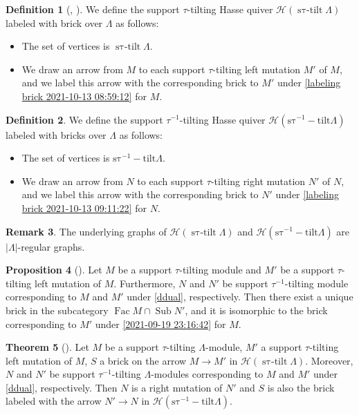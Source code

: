 \documentclass[pdftex,a4paper]{article}
\numberwithin{equation}{subsection}
\theoremstyle{definition}
\newtheorem{theorem}{Theorem}[section]
\newtheorem{proposition}[theorem]{Proposition}
\newtheorem{definition}[theorem]{Definition}
\newtheorem{remark}[theorem]{Remark}
\newcommand{\stautilt}{\operatorname{\mathrm{s\tau-tilt}}}
\newcommand{\stauitilt}{\operatorname{\mathrm{s\tau^{-1}-tilt}}}
\newcommand{\Fac}{\operatorname{\mathrm{Fac}}}
\newcommand{\Sub}{\operatorname{\mathrm{Sub}}}
\begin{document}
\begin{definition}
	[{\cite[Definition 2.29]{MR3187626}, \cite[Definition 2.14]{MR4139031}}]\label{Hasse rabeled by brick}
	We define the support \(\tau\)-tilting Hasse quiver \(\mathcal{H}(\stautilt \Lambda)\) labeled with brick over \(\Lambda\) as follows:
	\begin{itemize}
		\item The set of vertices is \(\stautilt \Lambda\).
		\item We draw an arrow from \(M\) to each support \(\tau\)-tilting left mutation \(M'\) of \(M\), and we label this arrow with the corresponding brick to \(M'\) under \eqref{labeling brick 2021-10-13 08:59:12} for \(M\).
	\end{itemize}
\end{definition}

\begin{definition}
	\label{Hasse i rabeled by brick}
	We define the support \(\tau^{-1}\)-tilting Hasse quiver \(\mathcal{H}(\stauitilt \Lambda)\) labeled with bricks over \(\Lambda\) as follows:
	\begin{itemize}
		\item The set of vertices is \(\stauitilt \Lambda\).
		\item We draw an arrow from \(N\) to each support \(\tau\)-tilting right mutation \(N'\) of \(N\), and we label this arrow with the corresponding brick to \(N'\) under \eqref{labeling brick 2021-10-13 09:11:22} for \(N\).
	\end{itemize}
\end{definition}

\begin{remark}\label{2020-03-20 15:46:59}
	The underlying graphs of \(\mathcal{H}(\stautilt \Lambda)\) and \(\mathcal{H}(\stauitilt \Lambda)\) are \(|\Lambda|\)-regular graphs.
\end{remark}
\begin{proposition}[{\cite[Lemma 2.16, Proposition 2.17]{MR4139031}}]\label{labeling properties 2021-11-14 17:10:59}
	Let \(M\) be a support \(\tau\)-tilting module and \(M'\) be a support \(\tau\)-tilting left mutation of \(M\).
	Furthermore, \(N\) and \(N'\) be support \(\tau^{-1}\)-tilting module corresponding to \(M\) and \(M'\) under \eqref{ddual}, respectively.
	Then there exist a unique brick in the subcategory \(\Fac M \cap \Sub N'\), and it is isomorphic to the brick corresponding to \(M'\) under \eqref{2021-09-19 23:16:42} for \(M\).
\end{proposition}
\begin{theorem}
	[{\cite[Theorem 2.15, Lemma 2.16, Proposition 2.17]{MR4139031}}]
	Let \(M\) be a support \(\tau\)-tilting \(\Lambda\)-module, \(M'\) a support \(\tau\)-tilting left mutation of \(M\), \(S\) a brick on the arrow \(M\rightarrow M'\) in \(\mathcal{H}(\stautilt \Lambda)\).
	Moreover, \(N\) and \(N'\) be support \(\tau^{-1}\)-tilting \(\Lambda\)-modules corresponding to \(M\) and \(M'\) under \eqref{ddual}, respectively.
	Then \(N\) is a right mutation of \(N'\) and \(S\) is also  the brick labeled with the arrow \(N'\rightarrow N\) in \(\mathcal{H}(\stauitilt \Lambda)\).
\end{theorem}
\end{document}
